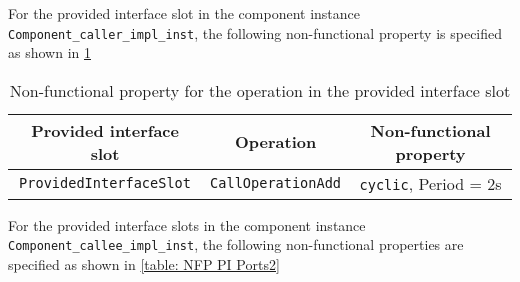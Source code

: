 \begin{description}
For the provided interface slot in the component instance \texttt{Component\allowbreak\_caller\allowbreak\_impl\_inst}, the following non-functional property is specified as shown in \cref{table: NFP PI Ports1}

\begin{table}[]
	\centering
	\caption{Non-functional property for the operation in the provided interface slot}
	\label{table: NFP PI Ports1}
	\begin{tabular}{lll}
		\hline
		\multicolumn{1}{|c|}{\textbf{Provided interface slot}} & \multicolumn{1}{c|}{\textbf{Operation}} & \multicolumn{1}{c|}{\textbf{Non-functional property}} \\ \hline
		\multicolumn{1}{|c|}{\texttt{ProvidedInterfaceSlot}} & \multicolumn{1}{c|}{\texttt{CallOperationAdd}} & \multicolumn{1}{c|}{\texttt{cyclic}, Period = 2s} \\ \hline
	\end{tabular}
\end{table}

For the provided interface slots in the component instance \texttt{Component\allowbreak\_callee\_impl\_inst}, the following non-functional properties are specified as shown in \cref{table: NFP PI Ports2}


\end{description}
